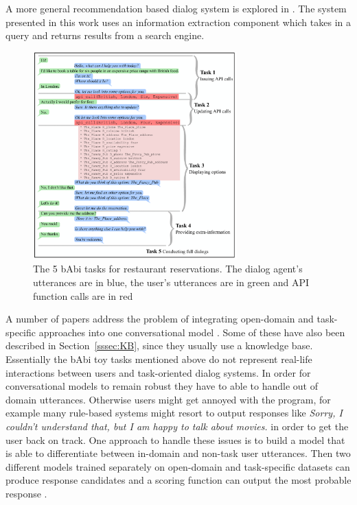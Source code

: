 \documentclass[12pt]{article}
\begin{document}
A more general recommendation based dialog system is explored in \cite{Yin:2017}. The system presented in this work uses an information extraction component which takes in a query and returns results from a search engine.

\begin{figure}[H]
	\centering
	\includegraphics[width=0.7\textwidth]{pics/babi.png}
	\caption{The 5 bAbi tasks for restaurant reservations. The dialog agent's utterances are in blue, the user's utterances are in green and API function calls are in red \cite{Bordes:2016}}
	\label{fig:babi}
\end{figure}
A number of papers address the problem of integrating open-domain and task-specific approaches into one conversational model \cite{Zhao:2017,Yu:2017,Akasaki:2017}. Some of these have also been described in Section~\ref{sssec:KB}, since they usually use a knowledge base. Essentially the bAbi toy tasks mentioned above do not represent real-life interactions between users and task-oriented dialog systems. In order for conversational models to remain robust they have to able to handle out of domain utterances. Otherwise users might get annoyed with the program, for example many rule-based systems might resort to output responses like \textit{Sorry, I couldn't understand that, but I am happy to talk about movies.} in order to get the user back on track. One approach to handle these issues is to build a model that is able to differentiate between in-domain and non-task user utterances. Then two different models trained separately on open-domain and task-specific datasets can produce response candidates and a scoring function can output the most probable response \cite{Akasaki:2017}.
\end{document}
